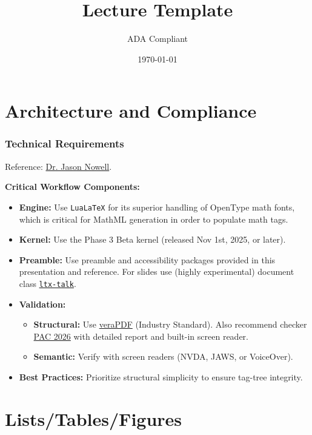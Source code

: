 \documentclass{ltx-talk}
\title[short-title={Lecture Template}]{Lecture Template}
\subtitle{ADA Compliant}
\author{}
\date{\today}
\begin{document}
\maketitle[framestyle=plain]
\tagstructend

\section{Architecture and Compliance}
	\begin{frame}
		\frametitle{Technical Requirements}
		Reference: \href{https://people.clas.ufl.edu/jnowell/latex-accessibility/}{Dr. Jason Nowell}.
		\vspace{0.5cm}
		
		\textbf{Critical Workflow Components:}
		\begin{itemize}
			\item \textbf{Engine:} Use \texttt{LuaLaTeX} for its superior handling of OpenType math fonts, which is critical for MathML generation in order to populate math tags.
			\item \textbf{Kernel:} Use the Phase 3 Beta kernel (released Nov 1st, 2025, or later).
			\item \textbf{Preamble:} Use preamble and accessibility packages provided in this presentation and reference.  For slides use (highly experimental) document class \href{https://ctan.math.illinois.edu/macros/latex/contrib/ltx-talk/ltx-talk.pdf}{\texttt{ltx-talk}}.
			\item \textbf{Validation:}
			\begin{itemize}
				\item \textbf{Structural:} Use \href{https://openpreservation.org/tools/verapdf/}{veraPDF} (Industry Standard).  Also recommend  checker \href{https://pac.pdf-accessibility.org/en}{PAC 2026} with detailed report and built-in screen reader.
				\item \textbf{Semantic:} Verify with screen readers (NVDA, JAWS, or VoiceOver).
			\end{itemize}
			\item \textbf{Best Practices:} Prioritize structural simplicity to ensure tag-tree integrity.
		\end{itemize}
	\end{frame}
	
\section{Lists/Tables/Figures}
	
\end{document}
